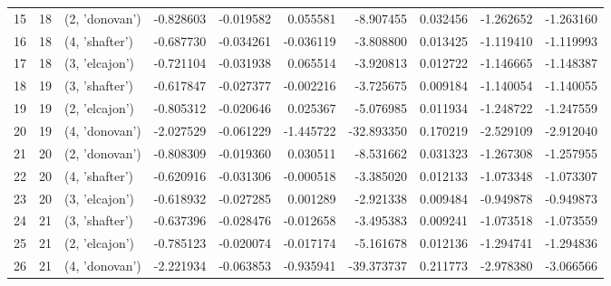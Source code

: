 \begin{tabular}{lrlrrrrrrr}
15 &     18 &  (2, 'donovan') & -0.828603 & -0.019582 &  0.055581 &  -8.907455 &  0.032456 & -1.262652 & -1.263160 \\
16 &     18 &  (4, 'shafter') & -0.687730 & -0.034261 & -0.036119 &  -3.808800 &  0.013425 & -1.119410 & -1.119993 \\
17 &     18 &  (3, 'elcajon') & -0.721104 & -0.031938 &  0.065514 &  -3.920813 &  0.012722 & -1.146665 & -1.148387 \\
18 &     19 &  (3, 'shafter') & -0.617847 & -0.027377 & -0.002216 &  -3.725675 &  0.009184 & -1.140054 & -1.140055 \\
19 &     19 &  (2, 'elcajon') & -0.805312 & -0.020646 &  0.025367 &  -5.076985 &  0.011934 & -1.248722 & -1.247559 \\
20 &     19 &  (4, 'donovan') & -2.027529 & -0.061229 & -1.445722 & -32.893350 &  0.170219 & -2.529109 & -2.912040 \\
21 &     20 &  (2, 'donovan') & -0.808309 & -0.019360 &  0.030511 &  -8.531662 &  0.031323 & -1.267308 & -1.257955 \\
22 &     20 &  (4, 'shafter') & -0.620916 & -0.031306 & -0.000518 &  -3.385020 &  0.012133 & -1.073348 & -1.073307 \\
23 &     20 &  (3, 'elcajon') & -0.618932 & -0.027285 &  0.001289 &  -2.921338 &  0.009484 & -0.949878 & -0.949873 \\
24 &     21 &  (3, 'shafter') & -0.637396 & -0.028476 & -0.012658 &  -3.495383 &  0.009241 & -1.073518 & -1.073559 \\
25 &     21 &  (2, 'elcajon') & -0.785123 & -0.020074 & -0.017174 &  -5.161678 &  0.012136 & -1.294741 & -1.294836 \\
26 &     21 &  (4, 'donovan') & -2.221934 & -0.063853 & -0.935941 & -39.373737 &  0.211773 & -2.978380 & -3.066566 \\
\bottomrule
\end{tabular}
